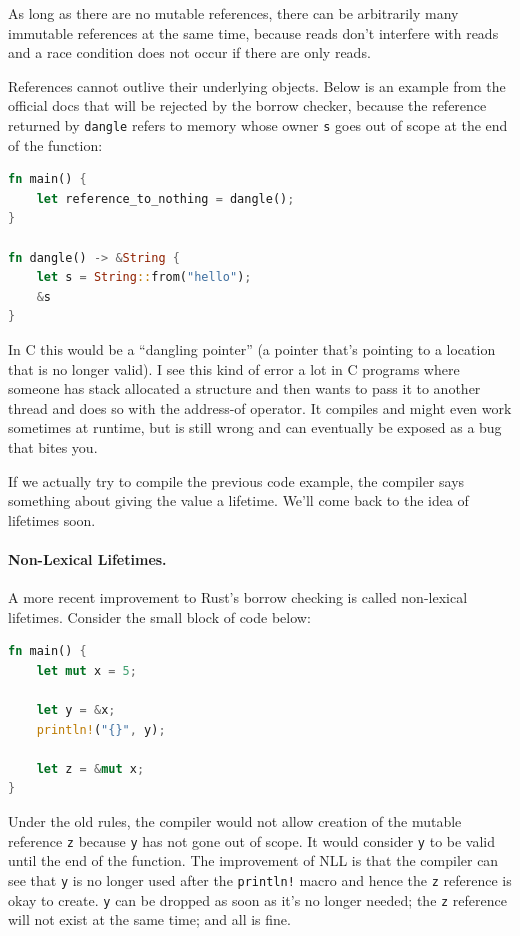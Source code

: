 As long as there are no mutable references, there can be arbitrarily many immutable references at the same time, because reads don't interfere with reads and a race condition does not occur if there are only reads. 

References cannot outlive their underlying objects. Below is an example from the official docs that will be rejected by the borrow checker, because the reference returned by \texttt{dangle} refers to memory whose owner \texttt{s} goes out of scope at the end of the function:

\begin{lstlisting}[language=Rust]
fn main() {
    let reference_to_nothing = dangle();
}

fn dangle() -> &String {
    let s = String::from("hello");
    &s
}
\end{lstlisting} 

In C this would be a ``dangling pointer'' (a pointer that's pointing to a location that is no longer valid). I see this kind of error a lot in C programs where someone has stack allocated a structure and then wants to pass it to another thread and does so with the address-of operator. It compiles and might even work sometimes at runtime, but is still wrong and can eventually be exposed as a bug that bites you.

If we actually try to compile the previous code example, the compiler says something about giving the value a lifetime. We'll come back to the idea of lifetimes soon.

\paragraph{Non-Lexical Lifetimes.} A more recent improvement to Rust's borrow checking is called non-lexical lifetimes. Consider the small block of code below:
\begin{lstlisting}[language=Rust]
fn main() {
    let mut x = 5;

    let y = &x;
    println!("{}", y);

    let z = &mut x;
}
\end{lstlisting}

Under the old rules, the compiler would not allow creation of the mutable reference \texttt{z} because \texttt{y} has not gone out of scope. It would consider \texttt{y} to be valid until the end of the function. The improvement of NLL is that the compiler can see that \texttt{y} is no longer used after the \texttt{println!} macro and hence the \texttt{z} reference is okay to create. \texttt{y} can be dropped as soon as it's no longer needed; the \texttt{z} reference will not exist at the same time; and all is fine.

